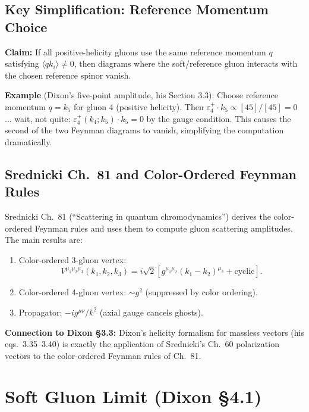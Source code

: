 \subsection{Key Simplification: Reference Momentum Choice}

\textbf{Claim:} If all positive-helicity gluons use the same reference momentum $q$ satisfying
$\langle qk_i\rangle\neq 0$, then diagrams where the soft/reference gluon interacts
with the chosen reference spinor vanish.

\textbf{Example} (Dixon's five-point amplitude, his Section 3.3):
Choose reference momentum $q=k_5$ for gluon 4 (positive helicity). Then
$\varepsilon_4^+\cdot k_5\propto[45]/[45]=0$ ... wait, not quite: $\varepsilon_4^+(k_4;k_5)\cdot k_5=0$
by the gauge condition. This causes the second of the two Feynman diagrams to vanish,
simplifying the computation dramatically.

\subsection{Srednicki Ch.~81 and Color-Ordered Feynman Rules}

Srednicki Ch.~81 (``Scattering in quantum chromodynamics'') derives the color-ordered
Feynman rules and uses them to compute gluon scattering amplitudes. The main results are:

\begin{enumerate}
  \item Color-ordered 3-gluon vertex:
        \begin{equation}
          V^{\mu_1\mu_2\mu_3}(k_1,k_2,k_3) = i\sqrt{2}
          [g^{\mu_1\mu_2}(k_1-k_2)^{\mu_3}+\mathrm{cyclic}].
        \end{equation}
  \item Color-ordered 4-gluon vertex: $\sim g^2$ (suppressed by color ordering).
  \item Propagator: $-ig^{\mu\nu}/k^2$ (axial gauge cancels ghosts).
\end{enumerate}

\textbf{Connection to Dixon \S3.3:} Dixon's helicity formalism for massless vectors
(his eqs.~3.35--3.40) is exactly the application of Srednicki's Ch.~60 polarization
vectors to the color-ordered Feynman rules of Ch.~81.


\section{Soft Gluon Limit (Dixon \S4.1)}
\label{sec:soft-gluon}

